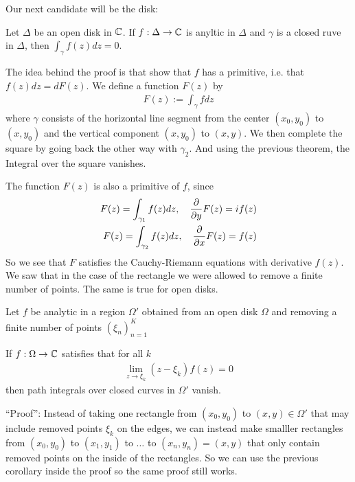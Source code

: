 Our next candidate will be the disk:
\begin{proposition}
	Let $\Delta$ be an open disk in $\mathbb{C}$. If $f: \Delta \to \mathbb{C}$ is anyltic in $\Delta$ and $\gamma$ is a closed ruve in $\Delta$, then $\int_{\gamma}f(z) dz = 0$.
\end{proposition}
The idea behind the proof is that show that $f$ has a primitive, i.e. that $f(z) dz = d F(z)$.
We define a function $F(z)$ by
\begin{align*}
	F(z) := \int_{\gamma} f dz
\end{align*}
where $\gamma$ consists of the horizontal line segment from the center $(x_0, y_0)$ to $(x,y_0)$ and the vertical component $(x,y_0)$ to $(x,y)$. We then complete the square by going back the other way with $\gamma_2$. And using the previous theorem, the Integral over the square vanishes.

The function $F(z)$ is also a primitive of $f$, since
\begin{align*}
	F(z) = \int_{\gamma_1} f(z) dz, \quad \frac{\partial }{\partial y}F(z) = i f(z)\\
	F(z) = \int_{\gamma_2}f(z) dz, \quad \frac{\partial }{\partial x}F(z) = f(z)
\end{align*}
So we see that $F$ satisfies the Cauchy-Riemann equations with derivative $f(z)$.\\


We saw that in the case of the rectangle we were allowed to remove a finite number of points. The same is true for open disks.


\begin{corollary}[]
	Let $f$ be analytic in a region $\Omega'$ obtained from an open disk $\Omega$ and removing a finite number of points $\left(\xi_{n}\right)_{n =1}^K$

	If $f: \Omega \to \mathbb{C}$ satisfies that for all $k$
	\begin{align*}
		\lim_{z \to \xi_k} (z - \xi_k) f(z) = 0
	\end{align*}
	then path integrals over closed curves in $\Omega'$ vanish.
\end{corollary}
``Proof'': Instead of taking one rectangle from $(x_0,y_0)$ to $(x,y) \in \Omega'$ that may include removed points $\xi_k$ on the edges, we can instead make smalller rectangles from $(x_0,y_0)$ to $(x_1, y_1)$ to $\ldots$ to $(x_n,y_n) = (x,y)$ that only contain removed points on the inside of the rectangles. So we can use the previous corollary inside the proof so the same proof still works.\\


